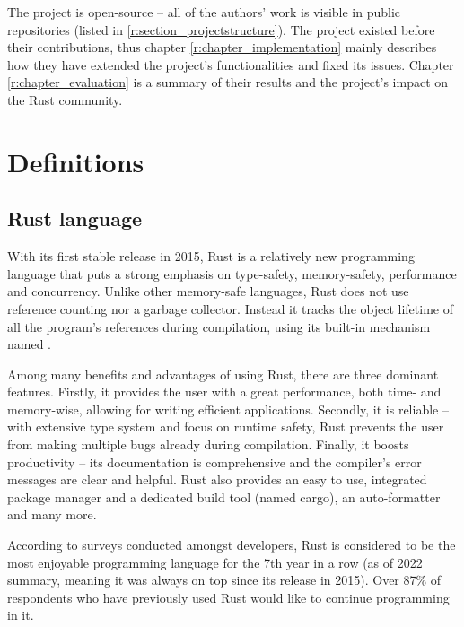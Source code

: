 \documentclass[licencjacka,en]{pracamgr}
\begin{document}
The project is open-source -- all of the authors' work is visible in public repositories (listed in
\ref{r:section_projectstructure}). The project existed before their contributions, thus chapter
\ref{r:chapter_implementation} mainly describes how they have extended the project's
functionalities and fixed its issues. Chapter \ref{r:chapter_evaluation} is a summary of their
results and the project's impact on the Rust community.


\chapter{Definitions}\label{r:chapter_definitions}

\section{Rust language}\label{r:section_rust_language}

With its first stable release in 2015, Rust is a relatively new programming language that
puts a strong emphasis on type-safety, memory-safety, performance and concurrency. Unlike
other memory-safe languages, Rust does not use reference counting nor a garbage collector.
Instead it tracks the object lifetime of all the program's references during compilation,
using its built-in mechanism named .

Among many benefits and advantages of using Rust, there are three dominant features. Firstly,
it provides the user with a great performance, both time- and memory-wise, allowing for
writing efficient applications. Secondly, it is reliable -- with extensive type system and
focus on runtime safety, Rust prevents the user from making multiple bugs
already during compilation. Finally, it boosts productivity -- its documentation is
comprehensive and the compiler's error messages are clear and helpful. Rust also provides
an easy to use, integrated package manager and a dedicated build tool (named cargo),
an auto-formatter and many more.

According to surveys \cite{survey} conducted amongst developers, Rust is considered to be the most
enjoyable programming language for the 7th year in a row (as of 2022 summary, meaning it was always
on top since its release in 2015). Over 87\% of respondents who have previously used Rust would
like to continue programming in it.
\end{document}
